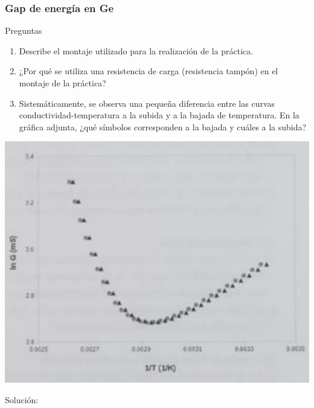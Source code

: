 \begin{Enunciado}
\subsubsection{Gap de energía en Ge}
\begin{minipage}{0.5\linewidth}
    Preguntas
    \begin{enumerate}[label=\alph*)]
    \item Describe el montaje utilizado para la realización de la práctica.
    \item ¿Por qué se utiliza una resistencia de carga (resistencia tampón) en el montaje de la práctica?
    \item Sistemáticamente, se observa una pequeña diferencia entre las curvas conductividad-temperatura a la subida y a la bajada de temperatura. En la gráfica adjunta, ¿qué símbolos corresponden a la bajada y cuáles a la subida?
    \end{enumerate}
\end{minipage}\hfill
\begin{minipage}{0.45\linewidth}
    \includegraphics[width=0.9\linewidth]{Cuerpo/Ch_02/Examen_24_7.png}
\end{minipage}
\end{Enunciado}
    
Solución:

